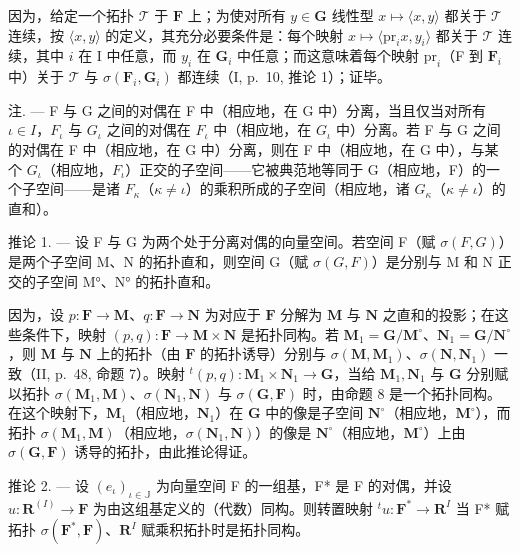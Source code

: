 因为，给定一个拓扑 \(\mathcal{T}\) 于 \(\mathbf{F}\) 上；为使对所有 \(y \in \mathbf{G}\) 线性型 \(x \mapsto \langle x, y \rangle\) 都关于 \(\mathcal{T}\) 连续，按 \(\langle x, y \rangle\) 的定义，其充分必要条件是：每个映射 \(x \mapsto \langle \mathrm{pr}_i x, y_i \rangle\) 都关于 \(\mathcal{T}\) 连续，其中 \(i\) 在 I 中任意，而 \(y_i\) 在 \(\mathbf{G}_i\) 中任意；而这意味着每个映射 \(\mathrm{pr}_i\)（F 到 \(\mathbf{F}_i\) 中）关于 \(\mathcal{T}\) 与 \(\sigma(\mathbf{F}_i, \mathbf{G}_i)\) 都连续（I, p.~10, 推论 1）；证毕。

注. --- F 与 G 之间的对偶在 F 中（相应地，在 G 中）分离，当且仅当对所有 \(\iota\in I\)，\(F_{\iota}\) 与 \(G_{\iota}\) 之间的对偶在 \(F_{\iota}\) 中（相应地，在 \(G_{\iota}\) 中）分离。若 F 与 G 之间的对偶在 F 中（相应地，在 G 中）分离，则在 F 中（相应地，在 G 中），与某个 \(G_{\iota}\)（相应地，\(F_{\iota}\)）正交的子空间——它被典范地等同于 G（相应地，F）的一个子空间——是诸 \(F_{\kappa}\)（\(\kappa\neq\iota\)）的乘积所成的子空间（相应地，诸 \(G_{\kappa}\)（\(\kappa\neq\iota\)）的直和）。

推论 1. --- 设 F 与 G 为两个处于分离对偶的向量空间。若空间 F（赋 \(\sigma(F, G)\)）是两个子空间 M、N 的拓扑直和，则空间 G（赋 \(\sigma(G, F)\)）是分别与 M 和 N 正交的子空间 M°、N° 的拓扑直和。

因为，设 \(p: \mathbf{F} \to \mathbf{M}\)、\(q: \mathbf{F} \to \mathbf{N}\) 为对应于 \(\mathbf{F}\) 分解为 \(\mathbf{M}\) 与 \(\mathbf{N}\) 之直和的投影；在这些条件下，映射 \((p, q): \mathbf{F} \to \mathbf{M} \times \mathbf{N}\) 是拓扑同构。若 \(\mathbf{M}_1 = \mathbf{G} / \mathbf{M}^\circ\)、\(\mathbf{N}_1 = \mathbf{G} / \mathbf{N}^\circ\)，则 \(\mathbf{M}\) 与 \(\mathbf{N}\) 上的拓扑（由 \(\mathbf{F}\) 的拓扑诱导）分别与 \(\sigma(\mathbf{M}, \mathbf{M}_1)\)、\(\sigma(\mathbf{N}, \mathbf{N}_1)\) 一致（II, p.~48, 命题 7）。映射 \(^t(p, q): \mathbf{M}_1 \times \mathbf{N}_1 \to \mathbf{G}\)，当给 \(\mathbf{M}_1, \mathbf{N}_1\) 与 \(\mathbf{G}\) 分别赋以拓扑 \(\sigma(\mathbf{M}_1, \mathbf{M})\)、\(\sigma(\mathbf{N}_1, \mathbf{N})\) 与 \(\sigma(\mathbf{G}, \mathbf{F})\) 时，由命题 8 是一个拓扑同构。在这个映射下，\(\mathbf{M}_1\)（相应地，\(\mathbf{N}_1\)）在 \(\mathbf{G}\) 中的像是子空间 \(\mathbf{N}^\circ\)（相应地，\(\mathbf{M}^\circ\)），而拓扑 \(\sigma(\mathbf{M}_1, \mathbf{M})\)（相应地，\(\sigma(\mathbf{N}_1, \mathbf{N})\)）的像是 \(\mathbf{N}^\circ\)（相应地，\(\mathbf{M}^\circ\)）上由 \(\sigma(\mathbf{G}, \mathbf{F})\) 诱导的拓扑，由此推论得证。

推论 2. --- 设 \((e_{\iota})_{\iota \in \mathbb{J}}\) 为向量空间 F 的一组基，F* 是 F 的对偶，并设 \(u: \mathbf{R}^{(I)} \to \mathbf{F}\) 为由这组基定义的（代数）同构。则转置映射 \({}^t u: \mathbf{F}^* \to \mathbf{R}^I\) 当 F* 赋拓扑 \(\sigma(\mathbf{F}^*, \mathbf{F})\)、\(\mathbf{R}^I\) 赋乘积拓扑时是拓扑同构。

